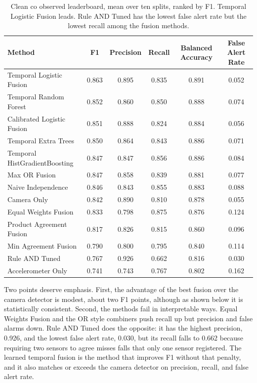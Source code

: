 \documentclass[conference]{IEEEtran}
\begin{document}
\begin{table}[t]
\centering
\caption{Clean co observed leaderboard, mean over ten splits, ranked by F1.
Temporal Logistic Fusion leads. Rule AND Tuned has the lowest false alert rate
but the lowest recall among the fusion methods.}
\label{tab:leaderboard}
\begin{tabular}{lccccc}
\toprule
Method & F1 & Precision & Recall & Balanced Accuracy & False Alert Rate \\
\midrule
Temporal Logistic Fusion       & 0.863 & 0.895 & 0.835 & 0.891 & 0.052 \\
Temporal Random Forest         & 0.852 & 0.860 & 0.850 & 0.888 & 0.074 \\
Calibrated Logistic Fusion     & 0.851 & 0.888 & 0.824 & 0.884 & 0.056 \\
Temporal Extra Trees           & 0.850 & 0.864 & 0.843 & 0.886 & 0.071 \\
Temporal HistGradientBoosting  & 0.847 & 0.847 & 0.856 & 0.886 & 0.084 \\
Max OR Fusion                  & 0.847 & 0.858 & 0.839 & 0.881 & 0.077 \\
Naive Independence             & 0.846 & 0.843 & 0.855 & 0.883 & 0.088 \\
Camera Only                    & 0.842 & 0.890 & 0.810 & 0.878 & 0.055 \\
Equal Weights Fusion           & 0.833 & 0.798 & 0.875 & 0.876 & 0.124 \\
Product Agreement Fusion       & 0.817 & 0.826 & 0.815 & 0.860 & 0.096 \\
Min Agreement Fusion           & 0.790 & 0.800 & 0.795 & 0.840 & 0.114 \\
Rule AND Tuned                 & 0.767 & 0.926 & 0.662 & 0.816 & 0.030 \\
Accelerometer Only             & 0.741 & 0.743 & 0.767 & 0.802 & 0.162 \\
\bottomrule
\end{tabular}
\end{table}

Two points deserve emphasis. First, the advantage of the best fusion over the
camera detector is modest, about two F1 points, although as shown below it is
statistically consistent. Second, the methods fail in interpretable ways. Equal
Weights Fusion and the OR style combiners push recall up but precision and false
alarms down. Rule AND Tuned does the opposite: it has the highest precision,
0.926, and the lowest false alert rate, 0.030, but its recall falls to 0.662
because requiring two sensors to agree misses falls that only one sensor
registered. The learned temporal fusion is the method that improves F1 without
that penalty, and it also matches or exceeds the camera detector on precision,
recall, and false alert rate.
\end{document}

